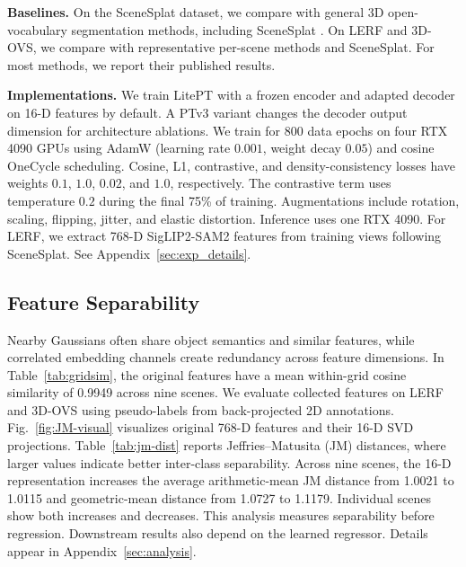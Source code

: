 \documentclass[10pt,twocolumn,letterpaper]{article}
\begin{document}
\noindent\textbf{Baselines.}
On the SceneSplat dataset, we compare with general 3D open-vocabulary segmentation methods, including SceneSplat \cite{li2025scenesplat,lee2025mosaic3d,jiang2024open,yang2024regionplc,ding2022language,peng2023openscene}. On LERF and 3D-OVS, we compare with representative per-scene methods \cite{drsplat25,cheng2024occamslgssimpleapproach} and SceneSplat. For most methods, we report their published results.

\noindent\textbf{Implementations.} We train LitePT with a frozen encoder and adapted decoder on 16-D features by default. A PTv3 variant changes the decoder output dimension for architecture ablations. We train for 800 data epochs on four RTX 4090 GPUs using AdamW (learning rate $0.001$, weight decay $0.05$) and cosine OneCycle scheduling. Cosine, L1, contrastive, and density-consistency losses have weights $0.1$, $1.0$, $0.02$, and $1.0$, respectively. The contrastive term uses temperature $0.2$ during the final 75\% of training. Augmentations include rotation, scaling, flipping, jitter, and elastic distortion. Inference uses one RTX 4090. For LERF, we extract 768-D SigLIP2-SAM2 features from training views following SceneSplat. See Appendix~\ref{sec:exp_details}.

\subsection{Feature Separability}
Nearby Gaussians often share object semantics and similar features, while correlated embedding channels create redundancy across feature dimensions. In Table~\ref{tab:gridsim}, the original features have a mean within-grid cosine similarity of 0.9949 across nine scenes. We evaluate collected features on LERF and 3D-OVS using pseudo-labels from back-projected 2D annotations. Fig.~\ref{fig:JM-visual} visualizes original 768-D features and their 16-D SVD projections. Table~\ref{tab:jm-dist} reports Jeffries--Matusita (JM) distances, where larger values indicate better inter-class separability. Across nine scenes, the 16-D representation increases the average arithmetic-mean JM distance from 1.0021 to 1.0115 and geometric-mean distance from 1.0727 to 1.1179. Individual scenes show both increases and decreases. This analysis measures separability before regression. Downstream results also depend on the learned regressor. Details appear in Appendix~\ref{sec:analysis}.
\end{document}
